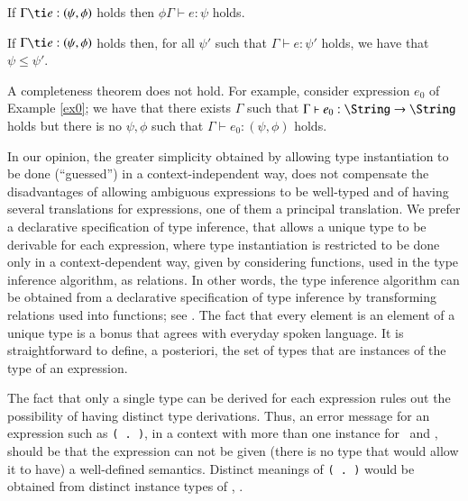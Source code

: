 \documentclass[review]{elsarticle}
\begin{document}
\begin{Theorem}[Soundness]

If $\Gamma \ti e: (\psi,\phi)$ holds then $\phi\Gamma \vdash e: \psi$ holds.

\end{Theorem}

\begin{Theorem}

If $\Gamma \ti e: (\psi,\phi)$ holds then, for all $\psi'$ such that
$\Gamma \vdash e: \psi'$ holds, we have that $\psi \leq \psi'$.

\label{Principal-type-theorem}
\end{Theorem}

A completeness theorem does not hold. For example, consider expression
$e_0$ %
of Example \ref{ex0}; we have that there exists $\Gamma$ such that
$\Gamma \vdash e_0: \String \rightarrow \String$ holds but there is no
$\psi,\phi$ such that $\Gamma \vdash e_0: (\psi,\phi)$ holds.

In our opinion, the greater simplicity obtained by allowing type
instantiation to be done (``guessed'') in a context-independent way,
does not compensate the disadvantages of allowing ambiguous
expressions to be well-typed and of having several translations for
expressions, one of them a principal translation. We prefer a
declarative specification of type inference, that allows a unique type
to be derivable for each expression, where type instantiation is
restricted to be done only in a context-dependent way, given by
considering functions, used in the type inference algorithm, as
relations. In other words, the type inference algorithm can be
obtained from a declarative specification of type inference by
transforming relations used into functions; see
\cite{Ambiguity-and-context-dependent-overloading}. The fact that
every element is an element of a unique type is a bonus that agrees
with everyday spoken language. It is straightforward to define, a
posteriori, the set of types that are instances of the type of an
expression.

The fact that only a single type can be derived for each expression
rules out the possibility of having distinct type derivations. Thus,
an error message for an expression such as {\tt (\sshow\ $\!\!$.$\!\!$
  \rread)}, in a context with more than one instance for \SShow\ and
\RRead, should be that the expression can not be given (there is no
type that would allow it to have) a well-defined semantics. Distinct
meanings of {\tt (\sshow\ $\!\!$.$\!\!$ \rread)} would be obtained
from distinct instance types of \sshow, \rread.
\end{document}
